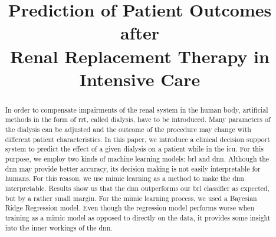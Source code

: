 \documentclass[conference,comsoc]{IEEEtran}
\begin{document}
\title{Prediction of Patient Outcomes after \\Renal Replacement Therapy in Intensive Care}


\author{
}
\maketitle

\begin{abstract}
In order to compensate impairments of the renal system in the human body, artificial methods in the form of \gls{rrt}, called dialysis, have to be introduced.
Many parameters of the dialysis can be adjusted and the outcome of the procedure may change with different patient characteristics. 
In this paper, we introduce a clinical decision support system to predict the effect of a given dialysis on a patient while in the \gls{icu}. 
For this purpose, we employ two kinds of machine learning models: \gls{brl} and \gls{dnn}. Although the \gls{dnn} may provide better accuracy, its decision making is not easily interpretable for humans. For this reason, we use mimic learning as a method to make the \gls{dnn} interpretable. 
Results show us that the \gls{dnn} outperforms our \gls{brl} classifier as expected, but by a rather small margin.
For the mimic learning process, we used a Bayesian Ridge Regression model.
Even though the regression model performs worse when training as a mimic model as opposed to directly on the data, it provides some insight into the inner workings of the \gls{dnn}.
\end{abstract}
\end{document}
